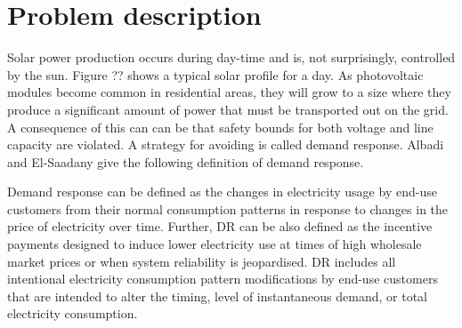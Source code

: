 \documentclass[class=book, crop=false]{standalone}
\begin{document}
\section{Problem description}
Solar power production occurs during day-time and is, not surprisingly, controlled by the sun. Figure ?? shows a typical solar profile for a day. As photovoltaic modules become common in residential areas, they will grow to a size where they produce a significant amount of power that must be transported out on the grid. A consequence of this can can be that safety bounds for both voltage and line capacity are violated. A strategy for avoiding is called demand response. Albadi and El-Saadany give the following definition of demand response.\cite{demand_response_definition}

\begin{displayquote}
Demand response can be defined as the changes in electricity usage by end-use customers from their normal consumption patterns in response to changes in the price of electricity over time. Further, DR can be also defined as the incentive payments designed to induce lower electricity use at times of high wholesale market prices or when system reliability is jeopardised. DR includes all intentional electricity consumption pattern modifications by end-use customers that are intended to alter the timing, level of
instantaneous demand, or total electricity consumption.
\end{displayquote}
\end{document}
